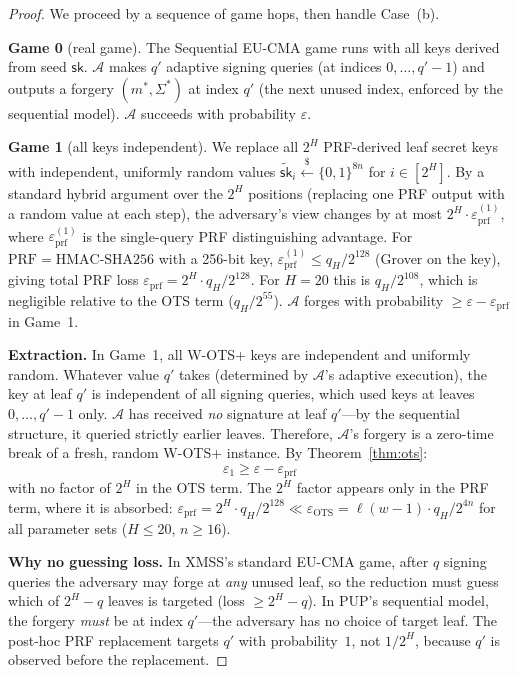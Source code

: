 \documentclass[11pt]{article}
\newcommand{\prf}{\mathrm{PRF}}
\newcommand{\bin}{\{0,1\}}
\begin{document}
\begin{proof}
We proceed by a sequence of game hops, then handle Case~(b).

\textbf{Game 0} (real game). The Sequential EU-CMA game runs with all
keys derived from seed $\mathsf{sk}$. $\mathcal{A}$ makes $q'$
adaptive signing queries (at indices $0, \ldots, q' - 1$) and outputs
a forgery $(m^*, \Sigma^*)$ at index $q'$ (the next unused index,
enforced by the sequential model). $\mathcal{A}$ succeeds with
probability $\varepsilon$.

\textbf{Game 1} (all keys independent). We replace all $2^H$
PRF-derived leaf secret keys with independent, uniformly random values
$\widetilde{\mathsf{sk}}_i \xleftarrow{\$} \bin^{8n}$ for
$i \in [2^H]$. By a standard hybrid argument over the $2^H$ positions
(replacing one PRF output with a random value at each step), the
adversary's view changes by at most $2^H \cdot
\varepsilon_{\mathrm{prf}}^{(1)}$, where
$\varepsilon_{\mathrm{prf}}^{(1)}$ is the single-query PRF
distinguishing advantage. For $\prf = \mathrm{HMAC}\text{-}
\mathrm{SHA256}$ with a 256-bit key,
$\varepsilon_{\mathrm{prf}}^{(1)} \leq q_H / 2^{128}$ (Grover on the
key), giving total PRF loss
$\varepsilon_{\mathrm{prf}} = 2^H \cdot q_H / 2^{128}$. For $H = 20$
this is $q_H / 2^{108}$, which is negligible relative to the OTS term
($q_H / 2^{55}$). $\mathcal{A}$ forges with probability
$\geq \varepsilon - \varepsilon_{\mathrm{prf}}$ in Game~1.

\textbf{Extraction.} In Game~1, all W-OTS+ keys are independent and
uniformly random. Whatever value $q'$ takes (determined by
$\mathcal{A}$'s adaptive execution), the key at leaf $q'$ is
independent of all signing queries, which used keys at leaves
$0, \ldots, q' - 1$ only. $\mathcal{A}$ has received \emph{no}
signature at leaf $q'$---by the sequential structure, it queried
strictly earlier leaves. Therefore, $\mathcal{A}$'s forgery is a
zero-time break of a fresh, random W-OTS+ instance. By
Theorem~\ref{thm:ots}:
\[
\varepsilon_1 \geq \varepsilon - \varepsilon_{\mathrm{prf}}
\]
with no factor of $2^H$ in the OTS term. The $2^H$ factor appears
only in the PRF term, where it is absorbed:
$\varepsilon_{\mathrm{prf}} = 2^H \cdot q_H / 2^{128} \ll
\varepsilon_{\mathrm{OTS}} = \ell(w-1) \cdot q_H / 2^{4n}$ for all
parameter sets ($H \leq 20$, $n \geq 16$).

\textbf{Why no guessing loss.} In XMSS's standard EU-CMA game, after
$q$ signing queries the adversary may forge at \emph{any} unused
leaf, so the reduction must guess which of $2^H - q$ leaves is
targeted (loss $\geq 2^H - q$). In PUP's sequential model, the
forgery \emph{must} be at index $q'$---the adversary has no choice of
target leaf. The post-hoc PRF replacement targets $q'$ with
probability~$1$, not $1/2^H$, because $q'$ is observed before the
replacement.


\end{proof}
\end{document}
